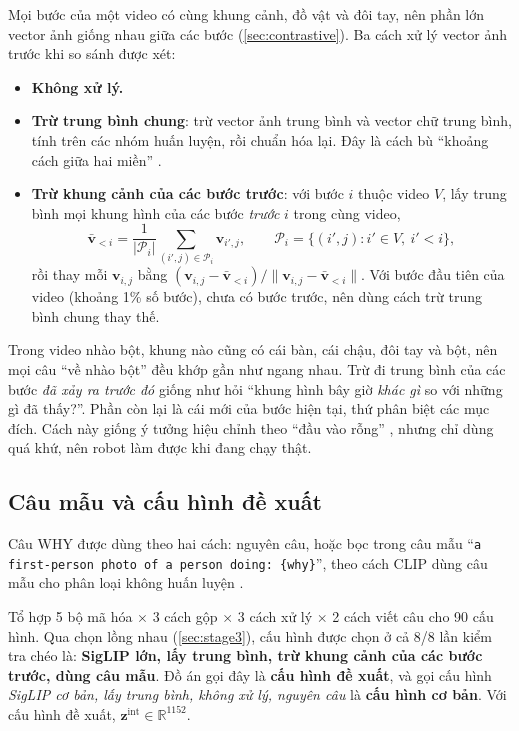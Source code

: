 \documentclass[a4paper,oneside]{report}
\newcommand{\R}{\mathbb{R}}
\begin{document}
Mọi bước của một video có cùng khung cảnh, đồ vật và đôi tay, nên phần lớn vector ảnh giống nhau giữa các bước (\cref{sec:contrastive}). Ba cách xử lý vector ảnh trước khi so sánh được xét:
\begin{itemize}
  \item \textbf{Không xử lý.}
  \item \textbf{Trừ trung bình chung}: trừ vector ảnh trung bình và vector chữ trung bình, tính trên các nhóm huấn luyện, rồi chuẩn hóa lại. Đây là cách bù ``khoảng cách giữa hai miền'' \citep{liang2022mindgap}.
  \item \textbf{Trừ khung cảnh của các bước trước}: với bước $i$ thuộc video $V$, lấy trung bình mọi khung hình của các bước \textit{trước} $i$ trong cùng video,
  \begin{equation}
    \bar{\mathbf{v}}_{<i} = \frac{1}{|\mathcal{P}_i|}\sum_{(i',j)\in\mathcal{P}_i}\mathbf{v}_{i',j},\qquad \mathcal{P}_i=\{(i',j): i'\in V,\ i'<i\},
    \label{eq:c2}
  \end{equation}
  rồi thay mỗi $\mathbf{v}_{i,j}$ bằng $(\mathbf{v}_{i,j}-\bar{\mathbf{v}}_{<i})/\lVert\mathbf{v}_{i,j}-\bar{\mathbf{v}}_{<i}\rVert$. Với bước đầu tiên của video (khoảng 1\% số bước), chưa có bước trước, nên dùng cách trừ trung bình chung thay thế.
\end{itemize}

\begin{giaithich}
Trong video nhào bột, khung nào cũng có cái bàn, cái chậu, đôi tay và bột, nên mọi câu ``về nhào bột'' đều khớp gần như ngang nhau. Trừ đi trung bình của các bước \textit{đã xảy ra trước đó} giống như hỏi ``khung hình bây giờ \textit{khác gì} so với những gì đã thấy?''. Phần còn lại là cái mới của bước hiện tại, thứ phân biệt các mục đích. Cách này giống ý tưởng hiệu chỉnh theo ``đầu vào rỗng'' \citep{zhao2021calibrate}, nhưng chỉ dùng quá khứ, nên robot làm được khi đang chạy thật.
\end{giaithich}

\subsection{Câu mẫu và cấu hình đề xuất}

Câu WHY được dùng theo hai cách: nguyên câu, hoặc bọc trong câu mẫu ``\texttt{a first-person photo of a person doing: \{why\}}'', theo cách CLIP dùng câu mẫu cho phân loại không huấn luyện \citep{radford2021clip}.

Tổ hợp 5 bộ mã hóa $\times$ 3 cách gộp $\times$ 3 cách xử lý $\times$ 2 cách viết câu cho 90 cấu hình. Qua chọn lồng nhau (\cref{sec:stage3}), cấu hình được chọn ở cả 8/8 lần kiểm tra chéo là: \textbf{SigLIP lớn, lấy trung bình, trừ khung cảnh của các bước trước, dùng câu mẫu}. Đồ án gọi đây là \textbf{cấu hình đề xuất}, và gọi cấu hình \textit{SigLIP cơ bản, lấy trung bình, không xử lý, nguyên câu} là \textbf{cấu hình cơ bản}. Với cấu hình đề xuất, $\mathbf{z}^{\mathrm{int}}\in\R^{1152}$.
\end{document}
